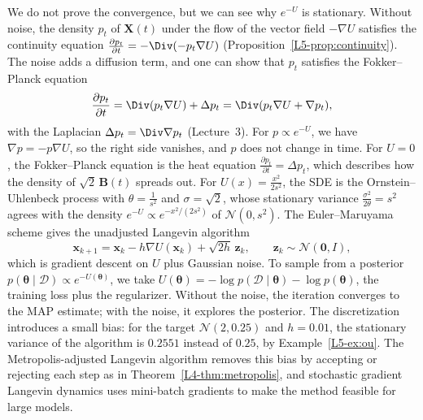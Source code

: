 We do not prove the convergence, but we can see why $e^{-U}$ is stationary. Without noise, the density $p_t$ of $\mathbf{X}(t)$ under the flow of the vector field $-\nabla U$ satisfies the continuity equation $\frac{\partial p_t}{\partial t} = -\Div(-p_t\nabla U)$ (Proposition~\ref{L5-prop:continuity}). The noise adds a diffusion term, and one can show that $p_t$ satisfies the Fokker--Planck equation
\[\frac{\partial p_t}{\partial t} = \Div(p_t\nabla U) + \Delta p_t = \Div(p_t\nabla U + \nabla p_t),\]
with the Laplacian $\Delta p_t = \Div\nabla p_t$ (Lecture~3). For $p \propto e^{-U}$, we have $\nabla p = -p\nabla U$, so the right side vanishes, and $p$ does not change in time. For $U = 0$, the Fokker--Planck equation is the heat equation $\frac{\partial p_t}{\partial t} = \Delta p_t$, which describes how the density of $\sqrt{2}\,\mathbf{B}(t)$ spreads out. For $U(x) = \frac{x^2}{2s^2}$, the SDE is the Ornstein--Uhlenbeck process with $\theta = \frac{1}{s^2}$ and $\sigma = \sqrt{2}$, whose stationary variance $\frac{\sigma^2}{2\theta} = s^2$ agrees with the density $e^{-U} \propto e^{-x^2/(2s^2)}$ of $\mathcal{N}(0, s^2)$. The Euler--Maruyama scheme gives the unadjusted Langevin algorithm
\[\mathbf{x}_{k+1} = \mathbf{x}_k - h\nabla U(\mathbf{x}_k) + \sqrt{2h}\,\mathbf{z}_k, \qquad \mathbf{z}_k \sim \mathcal{N}(\mathbf{0}, I),\]
which is gradient descent on $U$ plus Gaussian noise. To sample from a posterior $p(\boldsymbol{\theta} \mid \mathcal{D}) \propto e^{-U(\boldsymbol{\theta})}$, we take $U(\boldsymbol{\theta}) = -\log p(\mathcal{D} \mid \boldsymbol{\theta}) - \log p(\boldsymbol{\theta})$, the training loss plus the regularizer. Without the noise, the iteration converges to the MAP estimate; with the noise, it explores the posterior. The discretization introduces a small bias: for the target $\mathcal{N}(2, 0.25)$ and $h = 0.01$, the stationary variance of the algorithm is $0.2551$ instead of $0.25$, by Example~\ref{L5-ex:ou}. The Metropolis-adjusted Langevin algorithm removes this bias by accepting or rejecting each step as in Theorem~\ref{L4-thm:metropolis}, and stochastic gradient Langevin dynamics uses mini-batch gradients to make the method feasible for large models.

